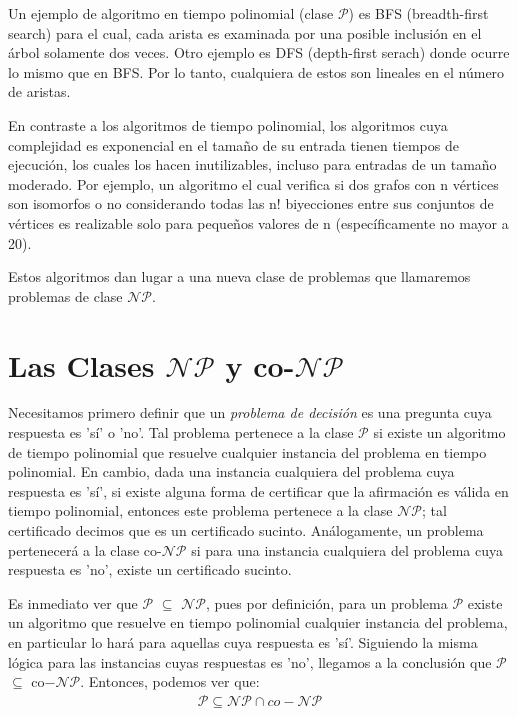 \documentclass{article}
\begin{document}
Un ejemplo de algoritmo en tiempo polinomial (clase $\mathcal{P}$)
es BFS (breadth-first search) para el cual, cada arista es examinada por una posible
inclusión en el árbol solamente dos veces. Otro ejemplo es DFS (depth-first serach)
donde ocurre lo mismo que en BFS. Por lo tanto, cualquiera de estos son
lineales en el número de aristas.

En contraste a los algoritmos de tiempo polinomial, los
algoritmos cuya complejidad es exponencial en el tamaño de su
entrada tienen tiempos de ejecución, los cuales los hacen inutilizables,
incluso para entradas de un tamaño moderado. Por ejemplo, un algoritmo
el cual verifica si dos grafos con n vértices son isomorfos o no 
considerando todas las n! biyecciones entre sus conjuntos de vértices es
realizable solo para pequeños valores de n (específicamente no mayor a 20).

Estos algoritmos dan lugar a una nueva clase de problemas que llamaremos
problemas de clase $\mathcal{NP}$.

\section*{Las Clases $\mathcal{NP}$ y co-$\mathcal{NP}$}
Necesitamos primero definir que un \textit{problema de decisión}
es una pregunta cuya respuesta es 'sí' o 'no'. Tal problema pertenece
a la clase $\mathcal{P}$ si existe un algoritmo de tiempo
polinomial que resuelve cualquier instancia del problema en tiempo
polinomial. En cambio, dada una instancia
cualquiera del problema cuya respuesta es 'sí', si existe alguna forma de 
certificar que la afirmación es válida en tiempo polinomial, entonces este problema
pertenece a la clase $\mathcal{NP}$; tal certificado decimos
que es un certificado sucinto. Análogamente,
un problema pertenecerá a la clase co-$\mathcal{NP}$ si para
una instancia cualquiera del problema cuya respuesta es 'no', existe un
certificado sucinto.

Es inmediato ver que 
$\mathcal{P}$ $\subseteq$ \textit{$\mathcal{NP}$},
pues por definición, para un problema $\mathcal{P}$ existe
un algoritmo que resuelve en tiempo polinomial cualquier instancia
del problema, en particular lo hará para aquellas cuya respuesta es
'sí'. Siguiendo la misma lógica para las instancias cuyas respuestas
es 'no', llegamos a la conclusión que $\mathcal{P}$
$\subseteq$ co$-\mathcal{NP}$. Entonces, podemos
ver que:
\begin{align*}
    \mathcal{P} \subseteq \mathcal{NP}
    \cap co-\mathcal{NP}
\end{align*}
\end{document}
